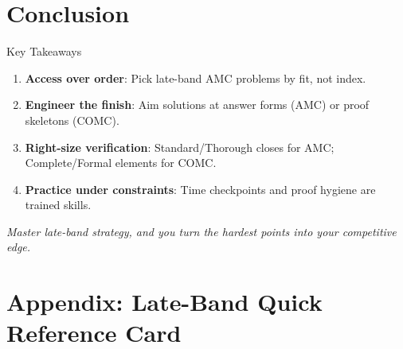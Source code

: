 \documentclass{article}
\begin{document}
\section{Conclusion}

\begin{successbox}{Key Takeaways}
\begin{enumerate}
    \item \textbf{Access over order}: Pick late-band AMC problems by fit, not index.
    \item \textbf{Engineer the finish}: Aim solutions at answer forms (AMC) or proof skeletons (COMC).
    \item \textbf{Right-size verification}: Standard/Thorough closes for AMC; Complete/Formal elements for COMC.
    \item \textbf{Practice under constraints}: Time checkpoints and proof hygiene are trained skills.
\end{enumerate}
\end{successbox}

\vfill
\begin{center}
\textit{Master late-band strategy, and you turn the hardest points into your competitive edge.}
\end{center}

\newpage
\section*{Appendix: Late-Band Quick Reference Card}
\end{document}
